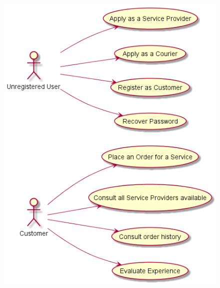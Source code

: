 \begin{figure}[ht]
\centering
\begin{minipage}{.5\textwidth}
  \centering
  \includegraphics[width=\linewidth]{chapters/Requirements_Engineering/assets/FrontOfficeUseCaseDiagram.png}
\end{minipage}%
\begin{minipage}{.5\textwidth}
  \centering

\end{minipage}
\end{figure}
